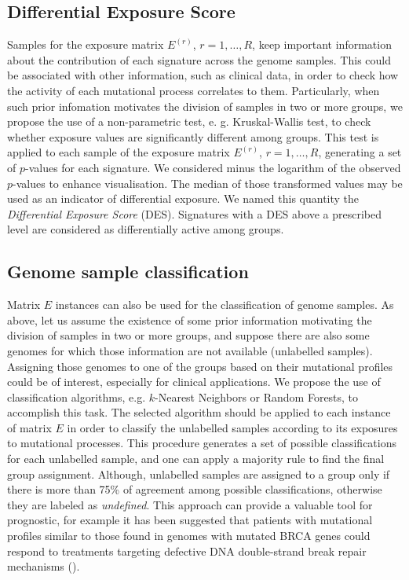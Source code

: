 \documentclass{bioinfo}
\begin{document}
\subsection{Differential Exposure Score}
Samples for the exposure matrix $E^{(r)}$, $r = 1, \ldots, R$, keep
important information about the contribution of each signature across
the genome samples. This could be associated with other information,
such as clinical data, in order to check how the activity of each
mutational process correlates to them. Particularly, when such prior
infomation motivates the division of samples in two or more groups, we
propose the use of a non-parametric test, e. g. Kruskal-Wallis test,
to check whether exposure values are significantly different among
groups. This test is applied to each sample of the exposure matrix
$E^{(r)}$, $r=1, \ldots, R$, generating a set of $p$-values for each 
signature.  We considered minus the logarithm of the observed
$p$-values to enhance visualisation. The median of those transformed
values may be used as an indicator of differential exposure. We named
this quantity the \emph{Differential Exposure Score} (DES). Signatures
with a DES above a prescribed level are considered as differentially 
active among groups.

\subsection{Genome sample classification}
Matrix $E$ instances can also be used for the classification of genome
samples.  As above, let us assume the existence of some prior
information motivating the division of samples in two or more groups,
and suppose there are also some genomes for which those information
are not available (unlabelled samples). Assigning those genomes to one
of the groups based on their mutational profiles could be of interest,
especially for clinical applications. We propose the use of
classification algorithms, e.g. $k$-Nearest Neighbors or Random
Forests, to accomplish this task. The selected algorithm should be
applied to each instance of matrix $E$ in order to classify the
unlabelled samples according to its exposures to mutational processes.
This procedure generates a set of possible classifications
for each unlabelled sample, and one can apply a majority rule to find
the final group assignment.  Although, unlabelled samples are assigned
to a group only if there is more than 75\% of agreement among possible
classifications, otherwise they are labeled as
\textit{undefined}. This approach can provide a valuable tool for
prognostic, for example it has been suggested that patients with
mutational profiles similar to those found in genomes with mutated
BRCA genes could respond to treatments targeting defective DNA
double-strand break repair mechanisms (\citealp{Ash}).
\end{document}

